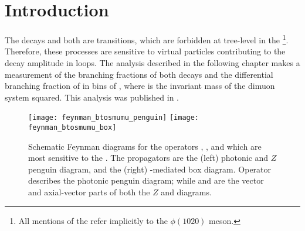\section{Introduction}

The decays \btokpipimumu and \btophikmumu both are \decay{\bquark}{\squark\mumu} \fcnc
transitions, which are forbidden at tree-level in the \sm\footnote{All mentions of the \phii
  refer implicitly to the $\phi(1020)$ meson.
}.
Therefore, these processes are sensitive to virtual \np particles contributing
to the decay amplitude in loops.
The analysis described in the following chapter makes a measurement of the branching fractions of
both decays and the differential branching
fraction of \btokpipimumu in bins of \qsq, where \qsq is the invariant mass of the dimuon system
squared.
This analysis was published in .



\begin{figure}
  \begin{center}
    \texttt{[image: feynman\_btosmumu\_penguin]}
    \texttt{[image: feynman\_btosmumu\_box]}
    \caption[Schematic Feynman diagrams for FCNCs]
    {
      Schematic Feynman diagrams for the operators , , and  which are most sensitive
      to the \decay{\bquark}{\squark\mumu} \fcnc.
      The propagators are the (left) photonic and $Z$ penguin diagram, and the (right) \Wp-mediated
      box diagram.
      Operator  describes the photonic penguin diagram; while  and  are the
      vector and axial-vector parts of both the $Z$ and \Wp diagrams.
    }
    \label{fig:hhh:loops}
  \end{center}
\end{figure}

